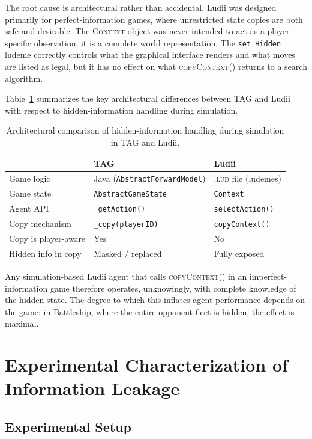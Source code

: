 The root cause is architectural rather than accidental. Ludii was designed primarily for perfect-information games, where unrestricted state copies are both safe and desirable. The \textsc{Context} object was never intended to act as a player-specific observation; it is a complete world representation. The \texttt{set Hidden} ludeme correctly controls what the graphical interface renders and what moves are listed as legal, but it has no effect on what \textsc{copyContext()} returns to a search algorithm.

Table~\ref{tab:arch_comparison} summarizes the key architectural differences between TAG and Ludii with respect to hidden-information handling during simulation.

\begin{table}[H]
\centering
\begin{tabular}{lll}
\hline
 & \textbf{TAG} & \textbf{Ludii} \\
\hline
Game logic & Java (\texttt{AbstractForwardModel}) & \textsc{.lud} file (ludemes) \\
Game state & \texttt{AbstractGameState} & \texttt{Context} \\
Agent API & \texttt{\_getAction()} & \texttt{selectAction()} \\
Copy mechanism & \texttt{\_copy(playerID)} & \texttt{copyContext()} \\
Copy is player-aware & Yes & No \\
Hidden info in copy & Masked / replaced & Fully exposed \\
\hline
\end{tabular}
\caption{Architectural comparison of hidden-information handling during simulation in TAG and Ludii.}
\label{tab:arch_comparison}
\end{table}

Any simulation-based Ludii agent that calls \textsc{copyContext()} in an imperfect-information game therefore operates, unknowingly, with complete knowledge of the hidden state. The degree to which this inflates agent performance depends on the game: in Battleship, where the entire opponent fleet is hidden, the effect is maximal.


\section{Experimental Characterization of Information Leakage}
\label{sec:leakage_experiment}

\subsection{Experimental Setup}

